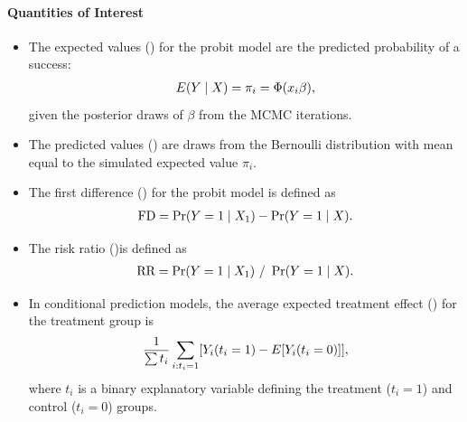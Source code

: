 \documentclass[letterpaper,10pt,english]{sphinxmanual}
\begin{document}
\paragraph{Quantities of Interest}
\label{zelig-probitbayes:quantities-of-interest}\begin{itemize}
\item {} 
The expected values () for the probit model are the
predicted probability of a success:
\begin{gather}
\begin{split}\begin{aligned}
E(Y \mid X) = \pi_{i}= \Phi(x_i \beta),\end{aligned}\end{split}\notag
\end{gather}
given the posterior draws of \(\beta\) from the MCMC iterations.

\item {} 
The predicted values () are draws from the Bernoulli
distribution with mean equal to the simulated expected value
\(\pi_{i}\).

\item {} 
The first difference () for the probit model is defined as
\begin{gather}
\begin{split}\begin{aligned}
\text{FD}=\Pr(Y=1\mid X_{1})-\Pr(Y=1\mid X).\end{aligned}\end{split}\notag
\end{gather}
\item {} 
The risk ratio ()is defined as
\begin{gather}
\begin{split}\begin{aligned}
\text{RR}=\Pr(Y=1\mid X_{1})\ /\ \Pr(Y=1\mid X).\end{aligned}\end{split}\notag
\end{gather}
\item {} 
In conditional prediction models, the average expected treatment
effect () for the treatment group is
\begin{gather}
\begin{split}\begin{aligned}
\frac{1}{\sum t_{i}}\sum_{i:t_{i}=1}[Y_{i}(t_{i}=1)-E[Y_{i}(t_{i}=0)]],\end{aligned}\end{split}\notag
\end{gather}
where \(t_{i}\) is a binary explanatory variable defining the
treatment (\(t_{i}=1\)) and control (\(t_{i}=0\)) groups.


\end{itemize}
\end{document}
